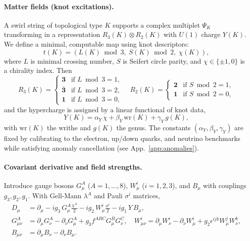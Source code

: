 \documentclass[10pt,reprint,aps,onecolumn,nofootinbib]{revtex4-2}
\begin{document}
\paragraph{Matter fields (knot excitations).}
    A swirl string of topological type $K$ supports a complex multiplet $\Psi_K$
    transforming in a representation $R_3(K)\otimes R_2(K)$ with $U(1)$ charge $Y(K)$.
    We define a minimal, computable map using knot descriptors:
    \[
        t(K)=(L(K)\bmod 3,\; S(K)\bmod 2,\; \chi(K)),
    \]
    where $L$ is minimal crossing number, $S$ is Seifert circle parity, and $\chi\!\in\!\{\pm 1,0\}$ is a chirality index.
    Then
    \[
        R_3(K)=
        \begin{cases}
        \mathbf{3} & \text{if } L\bmod 3=1,\\
        \bar{\mathbf{3}} & \text{if } L\bmod 3=2,\\
        \mathbf{1} & \text{if } L\bmod 3=0,
        \end{cases}\quad
        R_2(K)=
        \begin{cases}
        \mathbf{2} & \text{if } S\bmod 2=1,\\
        \mathbf{1} & \text{if } S\bmod 2=0,
        \end{cases}
    \]
    and the hypercharge is assigned by a linear functional of knot data,
    \[
        Y(K)=\alpha_Y\,\chi + \beta_Y\,\mathrm{wr}(K) + \gamma_Y\, g(K),
    \]
    with $\mathrm{wr}(K)$ the writhe and $g(K)$ the genus.
    The constants $(\alpha_Y,\beta_Y,\gamma_Y)$ are fixed by calibrating to the electron,
    up/down quarks, and neutrino benchmarks while satisfying anomaly cancellation
    (see App.~\ref{app:anomalies}).

\paragraph{Covariant derivative and field strengths.}
    Introduce gauge bosons
    $G_\mu^A$ ($A=1,\dots,8$), $W_\mu^i$ ($i=1,2,3$), and $B_\mu$ with couplings $g_3,g_2,g_1$.
    With Gell-Mann $\lambda^A$ and Pauli $\sigma^i$ matrices,
    \begin{align}
    D_\mu &= \partial_\mu
    - i g_3\, G_\mu^A \frac{\lambda^A}{2}
    - i g_2\, W_\mu^i \frac{\sigma^i}{2}
    - i g_1\, Y\, B_\mu, \label{eq:covD}\\[2mm]
    G_{\mu\nu}^A &= \partial_\mu G_\nu^A - \partial_\nu G_\mu^A
    + g_3 f^{ABC} G_\mu^B G_\nu^C,\quad
    W_{\mu\nu}^i = \partial_\mu W_\nu^i - \partial_\nu W_\mu^i
    + g_2 \epsilon^{ijk} W_\mu^j W_\nu^k, \nonumber\\
    B_{\mu\nu} &= \partial_\mu B_\nu - \partial_\nu B_\mu. \label{eq:YMstrengths}
    \end{align}
\end{document}
